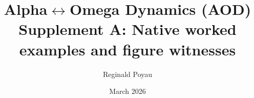 \title{Alpha$\leftrightarrow$Omega Dynamics (AOD)\\
\large Supplement A: Native worked examples and figure witnesses}
\author{Reginald Poyau}
\date{March 2026}
\maketitle

